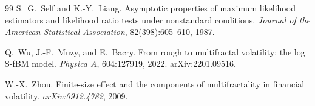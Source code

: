\documentclass[11pt]{article}
\begin{document}
\begin{thebibliography}{99}
S.~G.~Self and K.-Y.~Liang.
\newblock Asymptotic properties of maximum likelihood estimators and likelihood ratio tests under nonstandard conditions.
\newblock \emph{Journal of the American Statistical Association}, 82(398):605--610, 1987.

Q.~Wu, J.-F.~Muzy, and E.~Bacry.
\newblock From rough to multifractal volatility: the log S-fBM model.
\newblock \emph{Physica A}, 604:127919, 2022. arXiv:2201.09516.

W.-X.~Zhou.
\newblock Finite-size effect and the components of multifractality in financial volatility.
\newblock \emph{arXiv:0912.4782}, 2009.

\end{thebibliography}
\end{document}
